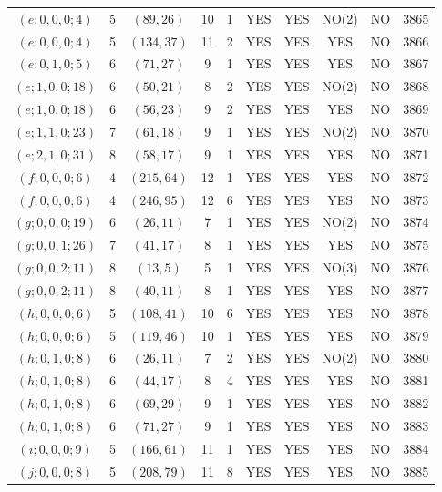 \begin{longtable}{|c|c|c|c|c|c|c|c|c|c|}
$(e; 0, 0, 0; 4)$ & 5 & $(89, 26)$ & 10 & 1 & YES & YES & NO(2) & NO & 3865\\
$(e; 0, 0, 0; 4)$ & 5 & $(134, 37)$ & 11 & 2 & YES & YES & YES & NO & 3866\\
$(e; 0, 1, 0; 5)$ & 6 & $(71, 27)$ & 9 & 1 & YES & YES & YES & NO & 3867\\
$(e; 1, 0, 0; 18)$ & 6 & $(50, 21)$ & 8 & 2 & YES & YES & NO(2) & NO & 3868\\
$(e; 1, 0, 0; 18)$ & 6 & $(56, 23)$ & 9 & 2 & YES & YES & YES & NO & 3869\\
$(e; 1, 1, 0; 23)$ & 7 & $(61, 18)$ & 9 & 1 & YES & YES & NO(2) & NO & 3870\\
$(e; 2, 1, 0; 31)$ & 8 & $(58, 17)$ & 9 & 1 & YES & YES & YES & NO & 3871\\
$(f; 0, 0, 0; 6)$ & 4 & $(215, 64)$ & 12 & 1 & YES & YES & YES & NO & 3872\\
$(f; 0, 0, 0; 6)$ & 4 & $(246, 95)$ & 12 & 6 & YES & YES & YES & NO & 3873\\
$(g; 0, 0, 0; 19)$ & 6 & $(26, 11)$ & 7 & 1 & YES & YES & NO(2) & NO & 3874\\
$(g; 0, 0, 1; 26)$ & 7 & $(41, 17)$ & 8 & 1 & YES & YES & YES & NO & 3875\\
$(g; 0, 0, 2; 11)$ & 8 & $(13, 5)$ & 5 & 1 & YES & YES & NO(3) & NO & 3876\\
$(g; 0, 0, 2; 11)$ & 8 & $(40, 11)$ & 8 & 1 & YES & YES & YES & NO & 3877\\
$(h; 0, 0, 0; 6)$ & 5 & $(108, 41)$ & 10 & 6 & YES & YES & YES & NO & 3878\\
$(h; 0, 0, 0; 6)$ & 5 & $(119, 46)$ & 10 & 1 & YES & YES & YES & NO & 3879\\
$(h; 0, 1, 0; 8)$ & 6 & $(26, 11)$ & 7 & 2 & YES & YES & NO(2) & NO & 3880\\
$(h; 0, 1, 0; 8)$ & 6 & $(44, 17)$ & 8 & 4 & YES & YES & YES & NO & 3881\\
$(h; 0, 1, 0; 8)$ & 6 & $(69, 29)$ & 9 & 1 & YES & YES & YES & NO & 3882\\
$(h; 0, 1, 0; 8)$ & 6 & $(71, 27)$ & 9 & 1 & YES & YES & YES & NO & 3883\\
$(i; 0, 0, 0; 9)$ & 5 & $(166, 61)$ & 11 & 1 & YES & YES & YES & NO & 3884\\
$(j; 0, 0, 0; 8)$ & 5 & $(208, 79)$ & 11 & 8 & YES & YES & YES & NO & 3885
\end{longtable}
